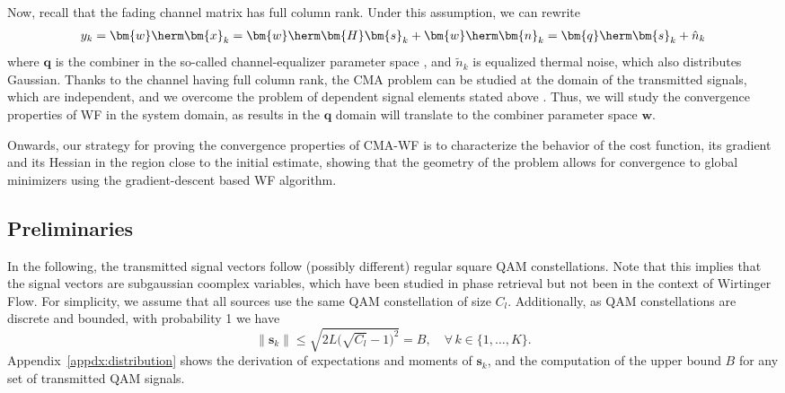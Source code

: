 Now, recall that the fading channel matrix has full column rank. Under this assumption, we can rewrite
\begin{align}
y_k=\bm{w}\herm\bm{x}_k=\bm{w}\herm\bm{H}\bm{s}_k+\bm{w}\herm\bm{n}_k=\bm{q}\herm\bm{s}_k+\hat{n}_k
\end{align}
where $\bm{q}$ is the combiner in the so-called channel-equalizer parameter space \cite{Ding2000}, and $\tilde{n}_k$ is equalized thermal noise, which also distributes Gaussian. Thanks to the channel having full column rank, the CMA problem can be studied at the domain of the transmitted signals, which are independent, and we overcome the problem of dependent signal elements stated above \cite{}. Thus, we will study the convergence properties of WF in the system domain, as results in the $\bm{q}$ domain will translate to the combiner parameter space $\bm{w}$.

Onwards, our strategy for proving the convergence properties of CMA-WF is to characterize the behavior of the cost function, its gradient and its Hessian in the region close to the initial estimate, showing that the geometry of the problem allows for convergence to global minimizers using the gradient-descent based WF algorithm.  

\subsection{Preliminaries}
In the following, the transmitted signal vectors follow (possibly different) regular square QAM constellations. Note that this implies that the signal vectors are subgaussian coomplex variables, which have been studied in phase retrieval \cite{Krahmer2019complexphaseretrieval} but not been in the context of Wirtinger Flow. For simplicity, we assume that all sources use the same QAM constellation of size $C_l$. Additionally, as QAM constellations are discrete and bounded, with probability 1 we have
\begin{equation}
\|\bm{s}_k\|\leq \sqrt{2L\big(\sqrt{C_l}-1\big)^2} = B,\quad\forall\,k\in\{1,\ldots,K\}.
\end{equation}
Appendix~\ref{appdx:distribution} shows the derivation of expectations and moments of $\bm{s}_k$, and the computation of the upper bound $B$ for any set of transmitted QAM signals. 


